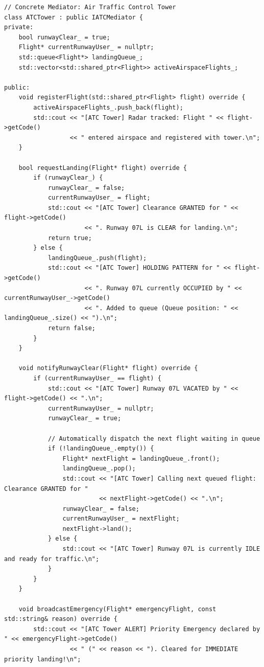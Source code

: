 \documentclass[12pt,a4paper]{article}
\begin{document}
\newpage
\begin{lstlisting}[caption={Concrete Mediator: Central ATCTower Engine}]
// Concrete Mediator: Air Traffic Control Tower
class ATCTower : public IATCMediator {
private:
    bool runwayClear_ = true;
    Flight* currentRunwayUser_ = nullptr;
    std::queue<Flight*> landingQueue_;
    std::vector<std::shared_ptr<Flight>> activeAirspaceFlights_;

public:
    void registerFlight(std::shared_ptr<Flight> flight) override {
        activeAirspaceFlights_.push_back(flight);
        std::cout << "[ATC Tower] Radar tracked: Flight " << flight->getCode() 
                  << " entered airspace and registered with tower.\n";
    }

    bool requestLanding(Flight* flight) override {
        if (runwayClear_) {
            runwayClear_ = false;
            currentRunwayUser_ = flight;
            std::cout << "[ATC Tower] Clearance GRANTED for " << flight->getCode() 
                      << ". Runway 07L is CLEAR for landing.\n";
            return true;
        } else {
            landingQueue_.push(flight);
            std::cout << "[ATC Tower] HOLDING PATTERN for " << flight->getCode() 
                      << ". Runway 07L currently OCCUPIED by " << currentRunwayUser_->getCode() 
                      << ". Added to queue (Queue position: " << landingQueue_.size() << ").\n";
            return false;
        }
    }

    void notifyRunwayClear(Flight* flight) override {
        if (currentRunwayUser_ == flight) {
            std::cout << "[ATC Tower] Runway 07L VACATED by " << flight->getCode() << ".\n";
            currentRunwayUser_ = nullptr;
            runwayClear_ = true;

            // Automatically dispatch the next flight waiting in queue
            if (!landingQueue_.empty()) {
                Flight* nextFlight = landingQueue_.front();
                landingQueue_.pop();
                std::cout << "[ATC Tower] Calling next queued flight: Clearance GRANTED for " 
                          << nextFlight->getCode() << ".\n";
                runwayClear_ = false;
                currentRunwayUser_ = nextFlight;
                nextFlight->land();
            } else {
                std::cout << "[ATC Tower] Runway 07L is currently IDLE and ready for traffic.\n";
            }
        }
    }

    void broadcastEmergency(Flight* emergencyFlight, const std::string& reason) override {
        std::cout << "[ATC Tower ALERT] Priority Emergency declared by " << emergencyFlight->getCode() 
                  << " (" << reason << "). Cleared for IMMEDIATE priority landing!\n";
        

\end{lstlisting}
\end{document}

